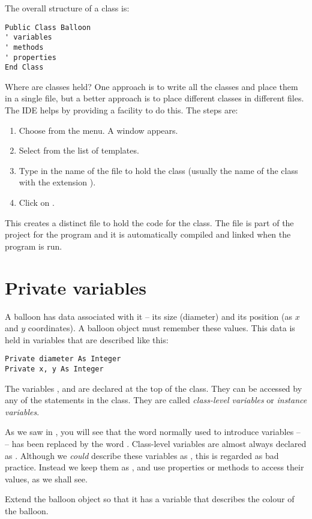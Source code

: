 		The overall structure of a class is:
		\begin{lstlisting}
Public Class Balloon
' variables
' methods
' properties
End Class
		\end{lstlisting}
		Where are classes held? One approach is to write all the classes and place them in a single file, but a better approach is to place different classes in different files. The IDE helps by providing a facility to do this. The steps are:
		\begin{enumerate}
			\item	Choose  from the  menu. A window appears.
			\item	Select  from the list of templates.
			\item	Type in the name of the file to hold the class (usually the name of the class with the extension ).
			\item	Click on .
		\end{enumerate}
		This creates a distinct file to hold the code for the class. The file is part of the project for the program and it is automatically compiled and linked when the program is run.


	\section{Private variables}
		A balloon has data associated with it – its size (diameter) and its position (as $x$ and $y$ coordinates). A balloon object must remember these values. This data is held in variables that are described like this:
		\begin{lstlisting}
Private diameter As Integer
Private x, y As Integer
		\end{lstlisting}
		The variables ,  and  are declared at the top of the class. They can be accessed by any of the statements in the class. They are called \emph{class-level variables} or \emph{instance variables}.
		
		As we saw in , you will see that the word normally used to introduce variables –  – has been replaced by the word . Class-level variables are almost always declared as . Although we \emph{could} describe these variables as , this is regarded as bad practice. Instead we keep them as , and use properties or methods to access their values, as we shall see.

		\begin{stqb}
			\begin{STQ}
				\item Extend the balloon object so that it has a variable that describes the colour of the balloon.
			\end{STQ}
		\end{stqb}

